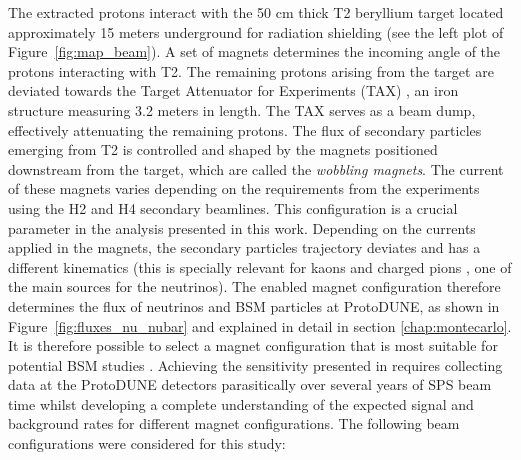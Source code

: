  The extracted protons interact with the 50 cm thick T2 beryllium target located approximately 15 meters underground for radiation shielding \cite{coloma2024new} (see the left plot of Figure~\ref{fig:map_beam}). A set of magnets determines the incoming angle of the protons interacting with T2. The remaining protons arising from the target are deviated towards the Target Attenuator for Experiments (TAX) \cite{SBA_TAX_Description_CERN}, an iron structure measuring 3.2 meters in length. The TAX serves as a beam dump, effectively attenuating the remaining protons. The flux of secondary particles emerging from T2 is controlled and shaped by the magnets positioned downstream from the target, {which are called the \it wobbling magnets}. The current of these magnets varies depending on the requirements from the experiments using the H2 and H4 secondary beamlines. This configuration is a crucial parameter in the analysis presented in this work. Depending on the currents applied in the magnets, the secondary particles trajectory deviates and has a different kinematics (this is specially relevant for kaons and charged pions , one of the main sources for the neutrinos). The enabled magnet configuration therefore determines the flux of neutrinos and BSM particles at ProtoDUNE, as shown in Figure~\ref{fig:fluxes_nu_nubar} and explained in detail in section \ref{chap:montecarlo}. It is therefore possible to select a magnet configuration that is most suitable for potential BSM studies \cite{coloma2024new}. Achieving the sensitivity presented in \cite{coloma2024new} requires collecting data at the ProtoDUNE detectors parasitically over several years of SPS beam time whilst developing a complete understanding of the expected signal and background rates for different magnet configurations. The following beam configurations were considered for this study:
